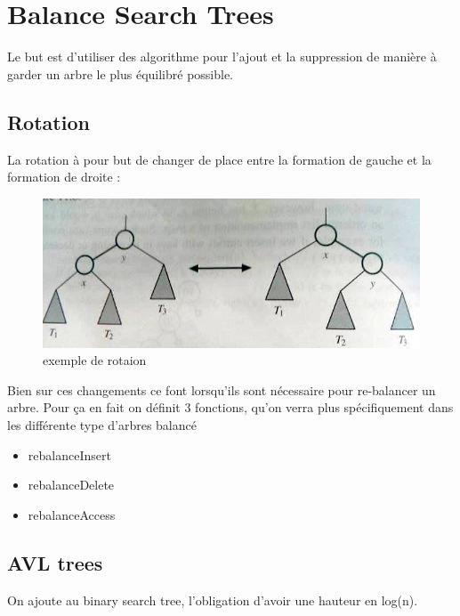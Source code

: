 \documentclass[a4paper]{article}
\begin{document}
\section{Balance Search Trees}
Le but est d'utiliser des algorithme pour l'ajout et la suppression de manière à garder un arbre le plus équilibré possible.

\subsection{Rotation}
La rotation à pour but de changer de place entre la formation de gauche et la formation de droite :
\begin{figure}[!h]
\begin{center}
\includegraphics[scale=0.4]{rotation.jpg}
\caption{exemple de rotaion}
\end{center}
\end{figure}

Bien sur ces changements ce font lorsqu'ils sont nécessaire pour re-balancer un arbre. Pour ça en fait on définit 3 fonctions, qu'on verra plus spécifiquement dans les différente type d'arbres balancé
\begin{itemize}
\item rebalanceInsert
\item rebalanceDelete
\item rebalanceAccess
\end{itemize}

\subsection{AVL trees}
On ajoute au binary search tree, l'obligation d'avoir une hauteur en log(n).
\end{document}
